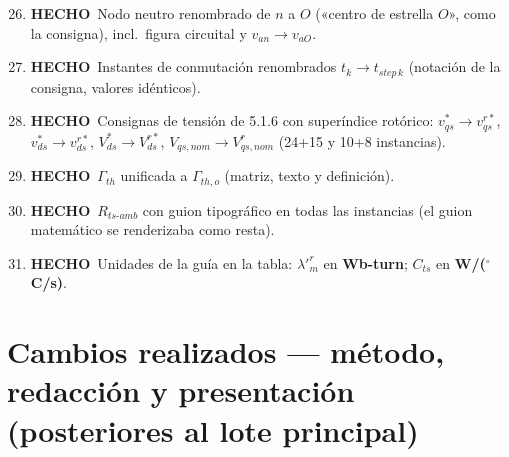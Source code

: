 \documentclass[11pt,a4paper]{article}
\newcommand{\hecho}{\textcolor{okgreen}{\textbf{HECHO}}}
\begin{document}
\begin{enumerate}[label=\textbf{ID \arabic*.}, leftmargin=1.6cm]
  \setcounter{enumi}{25}
  \item \hecho\ Nodo neutro renombrado de $n$ a $O$ («centro de estrella $O$», como la consigna), incl.\ figura circuital y $v_{an}\to v_{aO}$.
  \item \hecho\ Instantes de conmutación renombrados $t_k \to t_{step\,k}$ (notación de la consigna, valores idénticos).
  \item \hecho\ Consignas de tensión de 5.1.6 con superíndice rotórico: $v_{qs}^*\to v_{qs}^{r*}$, $v_{ds}^*\to v_{ds}^{r*}$, $V_{ds}^*\to V_{ds}^{r*}$, $V_{qs,nom}\to V_{qs,nom}^{r}$ (24+15 y 10+8 instancias).
  \setcounter{enumi}{32}
  \item \hecho\ $\Gamma_{th}$ unificada a $\Gamma_{th,o}$ (matriz, texto y definición).
  \item \hecho\ $R_{ts\text{-}amb}$ con guion tipográfico en todas las instancias (el guion matemático se renderizaba como resta).
  \item \hecho\ Unidades de la guía en la tabla: $\lambda'^r_m$ en \textbf{Wb-turn}; $C_{ts}$ en \textbf{W/($^\circ$C/s)}.
\end{enumerate}

\section{Cambios realizados --- método, redacción y presentación (posteriores al lote principal)}
\end{document}
